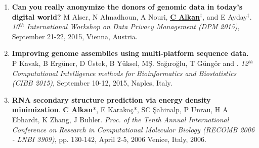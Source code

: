 \begin{enumerate}
    \item 

{\bf Can you really anonymize the donors of genomic data in today's digital world?}
M Alser, N Almadhoun, A Nouri, {\bf {\underline{C Alkan}}}$^\ddag$, and E Ayday$^\ddag$. 
{\em 10$^{th}$ International Workshop on Data Privacy Management (DPM 2015)}, 
 September 21-22, 2015, Vienna, Austria.


\item

{\bf Improving genome assemblies using multi-platform sequence data.}
P Kavak, B Ergüner, D Üstek, B Yüksel, MŞ. Sağıroğlu, T Güngör and \calkan{}.
{\em 12$^{th}$ Computational Intelligence methods for Bioinformatics and Biostatistics (CIBB 2015)}, 
 September 10-12, 2015, Naples, Italy.








\item
{\bf RNA secondary structure prediction via energy density minimization}.
{\bf {\underline{C Alkan}}}*, E Karako\c{c}*, SC \c{S}ahinalp, P Unrau,
H A Ebhardt, K Zhang, J Buhler.
{\em Proc. of the Tenth Annual International Conference on Research in Computational Molecular Biology
  (RECOMB 2006 - LNBI 3909)}, pp. 130-142,
  April 2-5, 2006 Venice, Italy, 2006.

\end{enumerate}



